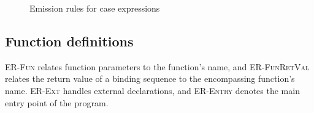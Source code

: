 \documentclass[main.tex]{subfiles}
\begin{document}
  \begin{figure}[h]
  \caption{Emission rules for case expressions}
  \label{fig:er-case}
  \end{figure}

	\subsection{Function definitions}
	
	\textsc{ER-Fun} relates function parameters to the function's name, and \textsc{ER-FunRetVal} relates the return value of a binding sequence to the encompassing function's name. \textsc{ER-Ext} handles external declarations, and \textsc{ER-Entry} denotes the main entry point of the program.
\end{document}
